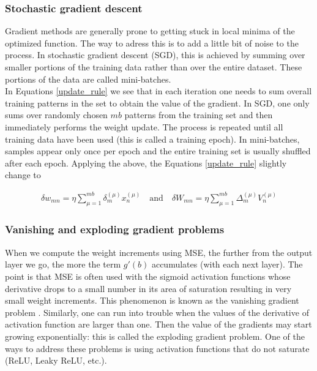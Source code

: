 \subsubsection{Stochastic gradient descent}

Gradient methods are generally prone to getting stuck in local minima of the optimized function. The way to adress this is to add a little bit of noise to the process. In stochastic gradient descent (SGD), this is achieved by summing over smaller portions of the training data rather than over the entire dataset. These portions of the data are called mini-batches. \cite{mehlig} \\

In Equations \ref{update_rule} we see that in each iteration one needs to sum overall training patterns in the set to obtain the value of the gradient. In SGD, one only sums over randomly chosen $ mb $ patterns from the training set and then immediately performs the weight update. The process is repeated until all training data have been used (this is called a training epoch). In mini-batches, samples appear only once per epoch and the entire training set is usually shuffled after each epoch. \cite{mehlig} Applying the above, the Equations \ref{update_rule} slightly change to \cite{mehlig}

\begin{gather}
\delta w_{mn} = \eta \sum\limits_{\mu=1}^{mb} \delta_{m}^{(\mu)} x_{n}^{(\mu)}
\quad \text{and} \quad 
\delta W_{mn} = \eta \sum\limits_{\mu=1}^{mb} \Delta_{m}^{(\mu)} V_{n}^{(\mu)}	
\end{gather}

\subsubsection{Vanishing and exploding gradient problems}

When we compute the weight increments using MSE, the further from the output layer we go, the more the term $ g'(b) $ accumulates (with each next layer). The point is that MSE is often used with the sigmoid activation functions whose derivative drops to a small number in its area of saturation resulting in very small weight increments. This phenomenon is known as the vanishing gradient problem \cite{mehlig}. Similarly, one can run into trouble when the values of the derivative of activation function are larger than one. Then the value of the gradients may start growing exponentially: this is called the exploding gradient problem. \cite{eniola} One of the ways to address these problems is using activation functions that do not saturate (ReLU, Leaky ReLU, etc.). \cite{mehlig} \cite{stanford-L4}

